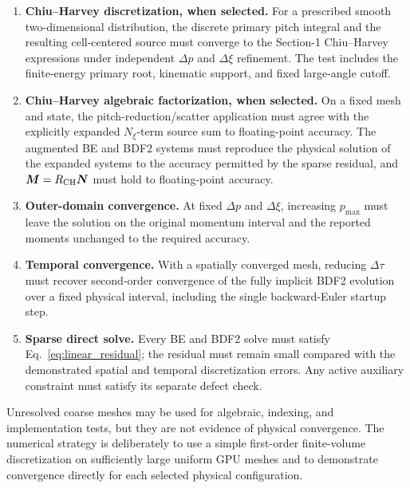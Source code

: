 \documentclass[11pt]{article}
\begin{document}
\begin{enumerate}
 \item \textbf{Chiu--Harvey discretization, when selected.}
       For a prescribed smooth two-dimensional distribution, the discrete primary pitch
       integral and the resulting cell-centered source must converge to the Section-1
       Chiu--Harvey expressions under independent $\Delta p$ and $\Delta\xi$ refinement.
       The test includes the finite-energy primary root, kinematic support, and fixed
       large-angle cutoff.

 \item \textbf{Chiu--Harvey algebraic factorization, when selected.}
       On a fixed mesh and state, the pitch-reduction/scatter application must agree with
       the explicitly expanded $N_\xi$-term source sum to floating-point accuracy.  The
       augmented BE and BDF2 systems must reproduce the physical solution of the expanded
       systems to the accuracy permitted by the sparse residual, and
       $\bm M=R_{\rm CH}\bm N$ must hold to floating-point accuracy.

 \item \textbf{Outer-domain convergence.}
       At fixed $\Delta p$ and $\Delta\xi$, increasing $p_{\max}$ must leave the solution
       on the original momentum interval and the reported moments unchanged to the
       required accuracy.

 \item \textbf{Temporal convergence.}
       With a spatially converged mesh, reducing $\Delta\tau$ must recover second-order
       convergence of the fully implicit BDF2 evolution over a fixed physical interval,
       including the single backward-Euler startup step.

 \item \textbf{Sparse direct solve.}
       Every BE and BDF2 solve must satisfy Eq.~\eqref{eq:linear_residual}; the residual
       must remain small compared with the demonstrated spatial and temporal
       discretization errors.  Any active auxiliary constraint must satisfy its separate
       defect check.
\end{enumerate}

Unresolved coarse meshes may be used for algebraic, indexing, and implementation tests,
but they are not evidence of physical convergence.  The numerical strategy is deliberately to use a simple first-order finite-volume
discretization on sufficiently large uniform GPU meshes and to demonstrate convergence
directly for each selected physical configuration.


\end{document}
